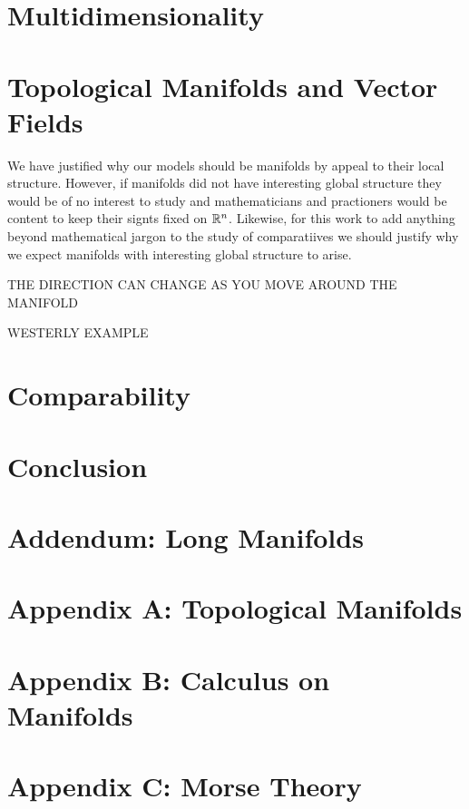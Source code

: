 \documentclass[12pt]{article}
\begin{document}
\section{Multidimensionality}

\section{Topological Manifolds and Vector Fields}

We have justified why our models should be manifolds by appeal to their local structure. However, if manifolds did not have interesting global structure they would be of no interest to study and mathematicians and practioners would be content to keep their signts fixed on $\mathbb{R}^n$. Likewise, for this work to add anything beyond mathematical jargon to the study of comparatiives we should justify why we expect manifolds with interesting global structure to arise. 

THE DIRECTION CAN CHANGE AS YOU MOVE AROUND THE MANIFOLD

WESTERLY EXAMPLE


\section{Comparability}

\section{Conclusion}

\section{Addendum: Long Manifolds}

\section{Appendix A: Topological Manifolds}

\section{Appendix B: Calculus on Manifolds}

\section{Appendix C: Morse Theory}
\end{document}

